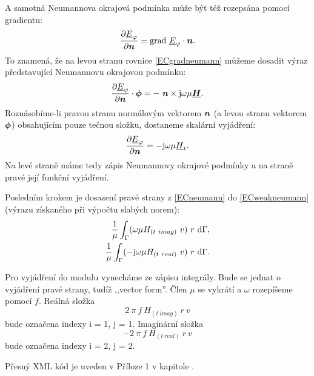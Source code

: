 \documentclass[12pt,a4paper,oneside]{article}
\numberwithin{equation}{section} %
\numberwithin{figure}{section} %
\numberwithin{table}{section} %
\newcommand{\mj}{\mathrm{j}} %
\renewcommand{\vec}[1]{\mbox{\boldmath$#1$}} %
\newcommand{\faz}[1]{{\underline{#1}}} %
\newcommand{\grad}{\mathrm{grad}\ }
\begin{document}
A samotná Neumannova okrajová podmínka může být též rozepsána pomocí gradientu:
\begin{equation}
\label{ECgradneumann}
\frac{\partial \faz{E} _{\varphi}}{\partial \vec{n}} = \grad \faz{E} _{\varphi} \cdot \vec{n} .
\end{equation}
To znamená, že na levou stranu rovnice \ref{ECgradneumann} můžeme dosadit výraz představující Neumannovu okrajovou podmínku:
\begin{equation}
\label{NeumannECvek}
\frac{\partial \faz{E}_{\varphi}}{\partial \vec{n}} \cdot \vec{\phi} = - ~ \vec{n} \times \mj \omega \mu \faz{\vec{H}} .
\end{equation}
Roznásobíme-li pravou stranu normálovým vektorem $\vec{n}$ (a levou stranu vektorem $\vec{\phi}$) obsahujícím pouze tečnou složku, dostaneme skalární vyjádření:
\begin{equation}
\label{ECneumann}
\frac{\partial \faz{E}_{\varphi}}{\partial \vec{n}} = - \mj \omega \mu \faz{H}_t .
\end{equation}
Na levé straně máme tedy zápis Neumannovy okrajové podmínky a na straně pravé její funkční vyjádření.

Posledním krokem je dosazení pravé strany z \ref{ECneumann} do \ref{ECweakneumann} (výrazu získaného při výpočtu slabých norem):
\begin{subequations}
\begin{align}
\frac{1}{\mu} \int _{\Gamma} ( \omega \mu H_{(t~imag)} ~ v ) ~ r ~ \ud \Gamma ,
\\ 
\frac{1}{\mu} \int _{\Gamma} ( - \mj \omega \mu H_{(t~real)} ~ v ) ~ r ~ \ud \Gamma .
\end{align}
\end{subequations}

Pro vyjádření do modulu vynecháme ze zápisu integrály. Bude se jednat o vyjádření pravé strany, tudíž ,,vector form''. Člen $\mu$ se vykrátí a $\omega$ rozepíšeme pomocí $f$. Reálná složka 
\begin{equation}
2 ~ \pi ~ f ~ H_{(t~imag)} ~ r ~ v
\end{equation} 
bude označena indexy i = 1, j = 1. Imaginární složka 
\begin{equation}
- 2 ~ \pi ~ f ~ H_{(t~real)} ~ r ~ v
\end{equation}
bude označena indexy i = 2, j = 2.

Přesný XML kód je uveden v Příloze 1 v kapitole .
\end{document}

